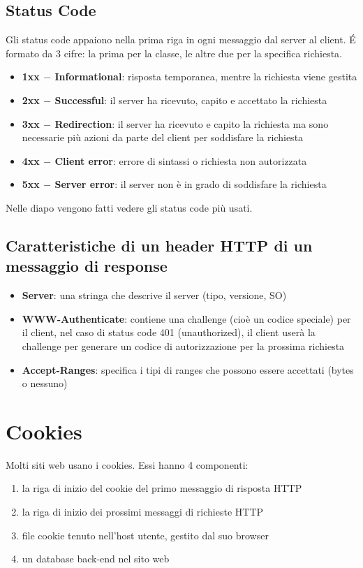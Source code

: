 \subsection{Status Code}
Gli status code appaiono nella prima riga in ogni messaggio dal server al client. \'E formato da 3 cifre: la prima per la classe, le altre due per la specifica richiesta. 
\begin{itemize}
    \item \textbf{1xx $-$ Informational}: risposta temporanea, mentre la richiesta viene gestita
    \item \textbf{2xx $-$ Successful}: il server ha ricevuto, capito e accettato la richiesta
    \item \textbf{3xx $-$ Redirection}: il server ha ricevuto e capito la richiesta ma sono necessarie più azioni da parte del client per soddisfare la richiesta
    \item \textbf{4xx $-$ Client error}: errore di sintassi o richiesta non autorizzata
    \item \textbf{5xx $-$ Server error}: il server non è in grado di soddisfare la richiesta
\end{itemize}

Nelle diapo vengono fatti vedere gli status code più usati.


\subsection{Caratteristiche di un header HTTP di un messaggio di response}
\begin{itemize}
    \item \textbf{Server}: una stringa che descrive il server (tipo, versione, SO)
    \item \textbf{WWW-Authenticate}: contiene una challenge (cioè un codice speciale) per il client, nel caso di status code 401 (unauthorized), il client userà la challenge per generare un codice di autorizzazione per la prossima richiesta
    \item \textbf{Accept-Ranges}: specifica i tipi di ranges che possono essere accettati (bytes o nessuno)
\end{itemize}


\section{Cookies}
Molti siti web usano i cookies. Essi hanno 4 componenti: 
\begin{enumerate}
    \item la riga di inizio del cookie del primo messaggio di risposta HTTP
    \item la riga di inizio dei prossimi messaggi di richieste HTTP
    \item file cookie tenuto nell'host utente, gestito dal suo browser
    \item un database back-end nel sito web
\end{enumerate}

